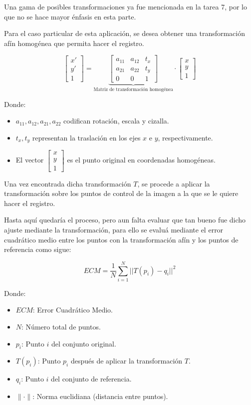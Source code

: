 \documentclass[11pt, letterpaper]{article}
\begin{document}
Una gama de posibles transformaciones ya fue mencionada en la tarea 7, por lo que no se hace mayor énfasis en esta parte.

Para el caso particular de esta aplicación, se desea obtener una transformación afín homogénea que permita hacer el registro.

$$
\begin{bmatrix}
	x' \\
	y' \\
	1
\end{bmatrix}
=
\underbrace{
	\begin{bmatrix}
		a_{11} & a_{12} & t_x \\
		a_{21} & a_{22} & t_y \\
		0 & 0 & 1
	\end{bmatrix}
}_{\text{Matriz de transformación homogénea}}
\cdot
\begin{bmatrix}
	x \\
	y \\
	1
\end{bmatrix}
$$

Donde:

\begin{itemize}
	\item $a_{11}, a_{12}, a_{21}, a_{22}$ codifican rotación, escala y cizalla.
	\item $t_x, t_y$ representan la traslación en los ejes $x$ e $y$, respectivamente.
	\item El vector $\begin{bmatrix} x \\ y \\ 1 \end{bmatrix}$ es el punto original en coordenadas homogéneas.
\end{itemize}

Una vez encontrada  dicha transformación $T$, se procede a aplicar la transformación sobre los puntos de control de la imagen a la que se le quiere hacer el registro.

Hasta aquí quedaría el proceso, pero aun falta evaluar que tan bueno fue dicho ajuste mediante la transformación, para ello se evaluá mediante el error cuadrático medio entre los puntos con la transformación afín y los puntos de referencia como sigue:

$$ECM = \frac{1}{N}\sum^N_{i = 1}{||T(p_i) -q_i||^2}$$

Donde: 

\begin{itemize}
	\item $ECM$: Error Cuadrático Medio.
	\item $N$: Número total de puntos.
	\item $p_i$: Punto $i$ del conjunto original.
	\item $T(p_i)$: Punto $p_i$ después de aplicar la transformación $T$.
	\item $q_i$: Punto $i$ del conjunto de referencia.
	\item $\|\cdot\|$: Norma euclidiana (distancia entre puntos).
\end{itemize}
\end{document}

